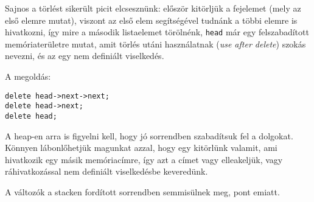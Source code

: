 \documentclass[a4paper,11.5pt]{article}
\begin{document}
	\begin{center}
	\end{center}
	Sajnos a törlést sikerült picit elcsesznünk: először kitörljük a fejelemet (mely az első elemre mutat), viszont az első elem segítségével tudnánk a többi elemre is hivatkozni, így mire a második listaelemet törölnénk, \texttt{head} már egy felszabadított memóriaterületre mutat, amit törlés utáni használatnak (\textit{use after delete}) szokás nevezni, és az egy nem definiált viselkedés.
	
	A megoldás:
	\begin{lstlisting}
delete head->next->next;
delete head->next;
delete head;
	\end{lstlisting}
	\begin{note}
		A heap-en arra is figyelni kell, hogy jó sorrendben szabadítsuk fel a dolgokat. Könnyen lábonlőhetjük magunkat azzal, hogy egy kitörlünk valamit, ami hivatkozik egy másik memóriacímre, így azt a címet vagy elleakeljük, vagy ráhivatkozással nem definiált viselkedésbe keveredünk.
	\end{note}
	A változók a stacken fordított sorrendben semmisülnek meg, pont emiatt.
	\medskip
	
\end{document}
